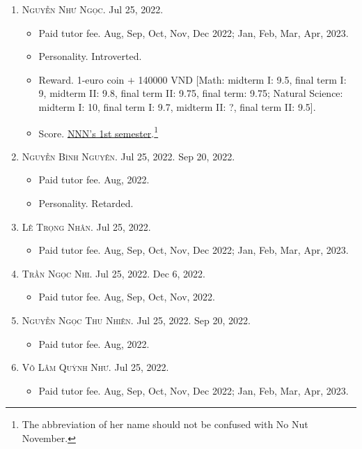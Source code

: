 \documentclass{article}
\begin{document}
\begin{enumerate}
\begin{itemize}
	\end{itemize}
	\item \textsc{Nguyễn Như Ngọc.} {\sf[In]} Jul 25, 2022.
	\begin{itemize}
		\item {\sf Paid tutor fee.} Aug, Sep, Oct, Nov, Dec 2022; Jan, Feb, Mar, Apr, 2023.
		\item {\sf Personality.} Introverted.
		\item {\sf Reward.} 1-euro coin $+$ 140000 VND [Math: midterm I: 9.5, final term I: 9, midterm II: 9.8, final term II: 9.75, final term: 9.75; Natural Science: midterm I: 10, final term I: 9.7, midterm II: ?, final term II: 9.5].
		\item {\sf Score.} \href{https://github.com/NQBH/hobby/blob/master/STEM/student/Nguyen_Nhu_Ngoc_grade_6_1st_semester.jpg}{NNN's 1st semester}.\footnote{The abbreviation of her name should not be confused with No Nut November.}
	\end{itemize}
	\item \textsc{Nguyễn Bình Nguyên.} {\sf[In]} Jul 25, 2022. {\sf[Out]} Sep 20, 2022.
	\begin{itemize}
		\item {\sf Paid tutor fee.} Aug, 2022.
		\item {\sf Personality.} Retarded.
	\end{itemize}
	\item \textsc{Lê Trọng Nhân.} {\sf[In]} Jul 25, 2022.
	\begin{itemize}
		\item {\sf Paid tutor fee.} Aug, Sep, Oct, Nov, Dec 2022; Jan, Feb, Mar, Apr, 2023.
	\end{itemize}
	\item \textsc{Trần Ngọc Nhi.} {\sf[In]} Jul 25, 2022. {\sf[Out]} Dec 6, 2022.
	\begin{itemize}
		\item {\sf Paid tutor fee.} Aug, Sep, Oct, Nov, 2022.
	\end{itemize}
	\item \textsc{Nguyễn Ngọc Thu Nhiên.} {\sf[In]} Jul 25, 2022. {\sf[Out]} Sep 20, 2022.
	\begin{itemize}
		\item {\sf Paid tutor fee.} Aug, 2022.
	\end{itemize}
	\item \textsc{Võ Lâm Quỳnh Như.} {\sf[In]} Jul 25, 2022.
	\begin{itemize}
		\item {\sf Paid tutor fee.} Aug, Sep, Oct, Nov, Dec 2022; Jan, Feb, Mar, Apr, 2023.

\end{itemize}
\end{enumerate}
\end{document}
